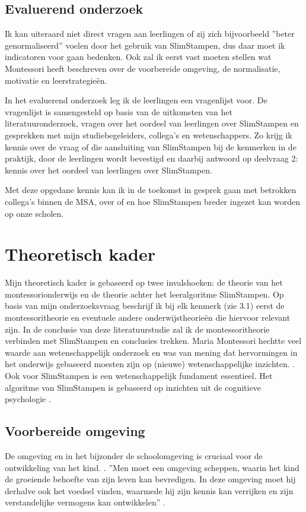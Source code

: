 \documentclass[12pt, a4paper]{article}
\begin{document}
\subsection{Evaluerend onderzoek}
Ik kan uiteraard niet direct vragen aan leerlingen of zij zich bijvoorbeeld  ''beter genormaliseerd'' voelen door het gebruik van SlimStampen, dus daar moet ik indicatoren voor gaan bedenken. Ook zal ik eerst vast moeten stellen wat Montessori heeft beschreven over de voorbereide omgeving, de normalisatie, motivatie en leerstrategieën.

In het evaluerend onderzoek leg ik de leerlingen een vragenlijst voor.
De vragenlijst is samengesteld op basis van de uitkomsten van het literatuuronderzoek, vragen over het oordeel van leerlingen over SlimStampen en gesprekken met mijn studiebegeleiders, collega's en wetenschappers. 
Zo krijg ik kennis over de vraag of die aansluiting van SlimStampen bij de kenmerken in de praktijk, door de leerlingen wordt bevestigd en daarbij antwoord op deelvraag 2: kennis over het oordeel van leerlingen over SlimStampen. 

Met deze opgedane kennis kan ik in de toekomst in gesprek gaan met betrokken collega's binnen de MSA, over of en hoe SlimStampen breder ingezet kan worden op onze scholen.

\newpage
\section{Theoretisch kader}
Mijn theoretisch kader is gebaseerd op twee invalshoeken: de theorie van het montessorionderwijs en de theorie achter het leeralgoritme SlimStampen. Op basis van mijn onderzoeksvraag beschrijf ik bij elk kenmerk (zie 3.1) eerst de montessoritheorie en eventuele andere onderwijstheorieën die hiervoor relevant zijn. In de conclusie van deze literatuurstudie zal ik de montessoritheorie verbinden met SlimStampen en conclusies trekken. 
Maria Montessori hechtte veel waarde aan wetenschappelijk onderzoek en was van mening dat hervormingen in het onderwijs gebaseerd moesten zijn op (nieuwe) wetenschappelijke inzichten. \cite[p.351]{Lillard}.
Ook voor SlimStampen is een wetenschappelijk fundament essentieel. Het algoritme van SlimStampen is gebaseerd op inzichten uit de cognitieve psychologie \cite[]{Rijn09}.

\subsection{Voorbereide omgeving}
De omgeving en in het bijzonder de schoolomgeving is cruciaal voor de ontwikkeling van het kind. \cite[p.212-217]{Montessori2012}.
''Men moet een omgeving scheppen, waarin het kind de groeiende behoefte van zijn leven kan bevredigen. In deze omgeving moet hij derhalve ook het voedsel vinden, waarmede hij zijn kennis kan verrijken en zijn verstandelijke vermogens kan ontwikkelen'' \cite[p.93]{Montessori1952}. 
\end{document}
